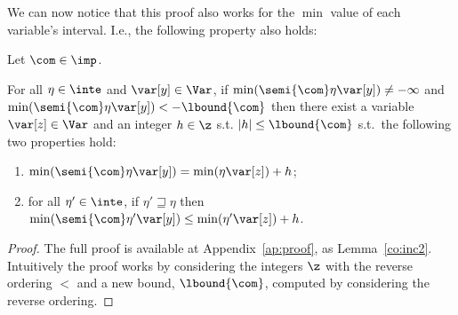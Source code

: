 We can now notice that this proof also works for the \(\min\) value of
each variable's interval. I.e., the following property also holds:

\begin{lemma}\label{le:dec}
  Let \(\com \in \imp\).
  
  \noindent
  For all \(\eta \in \inte\) and \(\var[y] \in \Var\), if
  \(\min(\semi{\com}\eta\var[y]) \neq -\infty\) and
  \(\min(\semi{\com}\eta\var[y]) < -\lbound{\com}\) then there exist a
  variable \(\var[z] \in\Var\) and an integer \(h \in \z\) s.t.
  \(|h| \leq \lbound{\com}\) s.t.\ the following two properties hold:
  
  \begin{enumerate}[label=(\roman*)]
  \item \(\min(\semi{\com}\eta \var[y]) = \min(\eta \var[z]) + h\);
  \item for all \(\eta' \in \inte\), if \(\eta' \sqsupseteq \eta\)
    then
    \(\min(\semi{\com}\eta' \var[y]) \leq \min(\eta' \var[z]) +
    h\).
  \end{enumerate}
\end{lemma}

\begin{proof}
  The full proof is available at Appendix~\ref{ap:proof}, as
  Lemma~\ref{co:inc2}. Intuitively the proof works by considering the
  integers \(\z\) with the reverse ordering \(<\) and a new bound,
  \(\lbound{\com}\), computed by considering the reverse ordering.
\end{proof}

